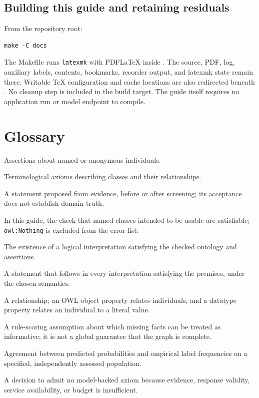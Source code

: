 \documentclass[11pt,a4paper]{article}
\newcommand{\code}[1]{\nolinkurl{#1}}
\newcommand{\file}[1]{\path{#1}}
\begin{document}
\subsection{Building this guide and retaining residuals}
From the repository root:
\begin{lstlisting}
make -C docs
\end{lstlisting}
The Makefile runs \code{latexmk} with PDFLaTeX inside \file{docs/}. The source,
PDF, log, auxiliary labels, contents, bookmarks, recorder output, and latexmk
state remain there. Writable TeX configuration and cache locations are also
redirected beneath \file{docs/}. No cleanup step is included in the build target.
The guide itself requires no application run or model endpoint to compile.

\section*{Glossary}
\begin{description}[style=nextline,leftmargin=1.5em,labelwidth=0pt,labelindent=0pt]
\item[ABox] Assertions about named or anonymous individuals.
\item[TBox] Terminological axioms describing classes and their relationships.
\item[Candidate axiom] A statement proposed from evidence, before or after screening;
its acceptance does not establish domain truth.
\item[Coherence] In this guide, the check that named classes intended to be usable
are satisfiable; \code{owl:Nothing} is excluded from the error list.
\item[Consistency] The existence of a logical interpretation satisfying the
checked ontology and assertions.
\item[Entailment] A statement that follows in every interpretation satisfying
the premises, under the chosen semantics.
\item[Role / property] A relationship; an OWL object property relates individuals,
and a datatype property relates an individual to a literal value.
\item[Partial completeness] A rule-scoring assumption about which missing facts
can be treated as informative; it is not a global guarantee that the graph is complete.
\item[Calibration] Agreement between predicted probabilities and empirical label
frequencies on a specified, independently assessed population.
\item[Abstention] A decision to admit no model-backed axiom because evidence,
response validity, service availability, or budget is insufficient.
\end{description}
\end{document}
